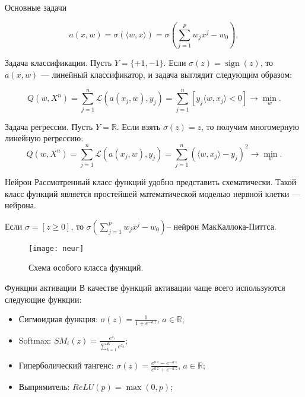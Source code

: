\documentclass[11pt]{beamer}
\DeclareMathOperator{\sign}{sign}
\begin{document}
	\begin{frame}{Основные задачи}
		
		\begin{equation*}
			a(x, w) = \sigma( \langle w,x \rangle ) = \sigma\left(\sum_{j=1}^{p} w_j x^j - w_0 \right),
		\end{equation*}
	
		Задача классификации. Пусть $Y=\{+1,-1\}$. Если $\sigma (z)=\sign(z)$, то $a(x,w)$ --- линейный классификатор, и задача выглядит следующим образом: 
		
		\begin{equation*}
			Q(w, X^{n})=\sum_{j=1}^{n} \mathcal{L} \left( a(x_j ,w), y_j \right) = \sum_{j=1}^{n} [y_j \langle w,x_j \rangle  < 0] \rightarrow \min_{w}.
		\end{equation*}
		
		Задача регрессии. Пусть $Y=\mathbb{R}$. Если взять $\sigma(z)=z$, то получим многомерную линейную регрессию:
		\begin{equation*}
			Q(w, X^{n})=\sum_{j=1}^{n} \mathcal{L} \left( a( x_j,w ), y_j \right)=\sum_{j=1}^{n}\left( \langle w,x_j \rangle  -y_j \right)^2 \rightarrow \min_{w}.
		\end{equation*}
	\end{frame}

	\begin{frame}{Нейрон}
		Рассмотренный класс функций удобно представить схематически. Такой класс функций является простейшей математической моделью нервной клетки --- нейрона.
		
		Если $\sigma = [z\geq0]$, то $\sigma\left(\sum_{j=1}^{p} w_j x^j - w_0 \right)$-- нейрон МакКаллока-Питтса. 
		
		\begin{figure}[H]
			\begin{center}
				\texttt{[image: neur]}
				\caption{Схема особого класса функций.} 
				\label{neur}
			\end{center}
		\end{figure}
	\end{frame}

	\begin{frame}{Функции активации}
		В качестве функций активации чаще всего используются следующие функции:
		\begin{itemize}
			\item Сигмоидная функция: $\sigma(z) = \frac{1}{1+e^{-a\,z}}$, $a \in \mathbb{R}$;
			
			\item Softmax: $SM_i(z)  = \frac{e^{z_i}}{\sum_{k=1}^{K}e^{z_k}}$;
			\item Гиперболический тангенс: $\sigma(z) = \frac{e^{a\,z} - e^{-a\,z}}{e^{a\,z} + e^{-a\,z}}$, $a \in \mathbb{R}$;
			\item Выпрямитель: $ReLU(p) = \max (0,p)$;
		\end{itemize}
	\end{frame}
\end{document}
